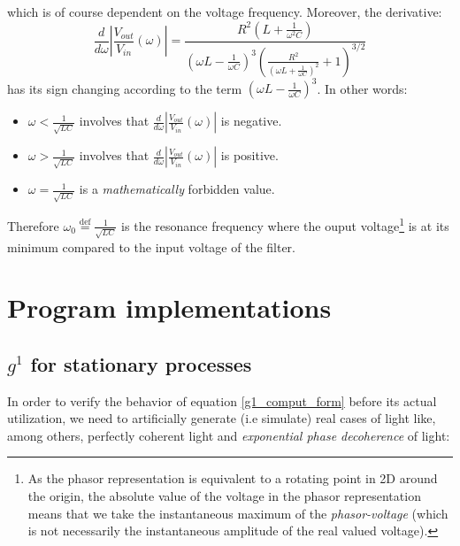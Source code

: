 \documentclass[11pt]{report}
\begin{document}
which is of course dependent on the voltage frequency. Moreover, the derivative:
\begin{equation}
\frac{d}{d\omega} \left\vert \frac{V_{out}}{V_{in}}(\omega) \right\vert = \frac{R^2\left(L + \frac{1}{\omega^2C}\right)}{\left(\omega L - \frac{1}{\omega C}\right)^3\left(\frac{R^2}{\left(\omega L + \frac{1}{\omega C}\right)^2} + 1\right)^{3/2}}
\end{equation}
has its sign changing according to the term $\left(\omega L - \frac{1}{\omega C}\right)^3$. In other words:
\begin{itemize}
	\item $\omega < \frac{1}{\sqrt{LC}}$ involves that $\frac{d}{d\omega} \left\vert \frac{V_{out}}{V_{in}}(\omega) \right\vert$ is negative.
	\item $\omega > \frac{1}{\sqrt{LC}}$ involves that $\frac{d}{d\omega} \left\vert \frac{V_{out}}{V_{in}}(\omega) \right\vert$ is positive.
	\item $\omega = \frac{1}{\sqrt{LC}}$ is a \textit{mathematically} forbidden value.
\end{itemize}
Therefore $\omega_0 \stackrel{\text{def}}{=} \frac{1}{\sqrt{LC}}$ is the resonance frequency where the ouput voltage\footnote{As the phasor representation is equivalent to a rotating point in 2D around the origin, the absolute value of the voltage in the phasor representation means that we take the instantaneous maximum of the \textit{phasor-voltage} (which is not necessarily the instantaneous amplitude of the real valued voltage).} is at its minimum compared to the input voltage of the filter.

\chapter{Program implementations}
\label{prog_impl}

\section{$g^1$ for stationary processes}

In order to verify the behavior of equation \eqref{g1_comput_form} before its actual utilization, we need to artificially generate (i.e simulate) real cases of light like, among others, perfectly coherent light and \textit{exponential phase decoherence} of light:
\end{document}
